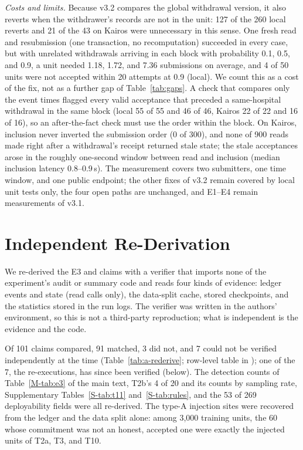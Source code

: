 \emph{Costs and limits.} Because v3.2 compares the global withdrawal version, it also reverts when the withdrawer's records are not in the unit: 127 of the 260 local reverts and 21 of the 43 on Kairos were unnecessary in this sense. One fresh read and resubmission (one transaction, no recomputation) succeeded in every case, but with unrelated withdrawals arriving in each block with probability 0.1, 0.5, and 0.9, a unit needed 1.18, 1.72, and 7.36 submissions on average, and 4 of 50 units were not accepted within 20 attempts at 0.9 (local). We count this as a cost of the fix, not as a further gap of Table~\ref{tab:gaps}. A check that compares only the event times flagged every valid acceptance that preceded a same-hospital withdrawal in the same block (local 55 of 55 and 46 of 46, Kairos 22 of 22 and 16 of 16), so an after-the-fact check must use the order within the block. On Kairos, inclusion never inverted the submission order (0 of 300), and none of 900 reads made right after a withdrawal's receipt returned stale state; the stale acceptances arose in the roughly one-second window between read and inclusion (median inclusion latency 0.8--0.9\,s). The measurement covers two submitters, one time window, and one public endpoint; the other fixes of v3.2 remain covered by local unit tests only, the four open paths are unchanged, and E1--E4 remain measurements of v3.1.



\section{Independent Re-Derivation}
\label{app:rederive}
We re-derived the E3 and \Lthree{} claims with a verifier that imports none of the experiment's audit or summary code and reads four kinds of evidence: ledger events and state (read calls only), the data-split cache, stored checkpoints, and the statistics stored in the run logs. The verifier was written in the authors' environment, so this is not a third-party reproduction; what is independent is the evidence and the code.

Of 101 claims compared, 91 matched, 3 did not, and 7 could not be verified independently at the time (Table~\ref{tab:a-rederive}; row-level table in ); one of the 7, the \Lone{} re-executions, has since been verified (below). The detection counts of Table~\ref{M-tab:e3} of the main text, T2b's 4 of 20 and its counts by sampling rate, Supplementary Tables~\ref{S-tab:t11} and~\ref{S-tab:rules}, and the 53 of 269 deployability fields were all re-derived. The type-A injection sites were recovered from the ledger and the data split alone: among 3,000 training units, the 60 whose commitment was not an honest, accepted one were exactly the injected units of T2a, T3, and T10.

